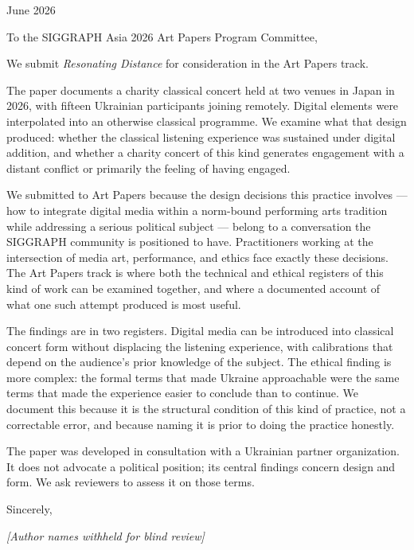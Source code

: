 \documentclass[12pt]{article}
\begin{document}
\begin{flushright}
June 2026
\end{flushright}

\bigskip\noindent
To the SIGGRAPH Asia 2026 Art Papers Program Committee,

\bigskip

We submit \textit{Resonating Distance} for consideration in the Art Papers track.

The paper documents a charity classical concert held at two venues in Japan in 2026, with
fifteen Ukrainian participants joining remotely. Digital elements were interpolated into an
otherwise classical programme. We examine what that design produced: whether the classical
listening experience was sustained under digital addition, and whether a charity concert of
this kind generates engagement with a distant conflict or primarily the feeling of having
engaged.

We submitted to Art Papers because the design decisions this practice involves --- how to
integrate digital media within a norm-bound performing arts tradition while addressing a
serious political subject --- belong to a conversation the SIGGRAPH community is positioned
to have. Practitioners working at the intersection of media art, performance, and ethics
face exactly these decisions. The Art Papers track is where both the technical and ethical
registers of this kind of work can be examined together, and where a documented account of
what one such attempt produced is most useful.

The findings are in two registers. Digital media can be introduced into classical concert
form without displacing the listening experience, with calibrations that depend on the
audience's prior knowledge of the subject. The ethical finding is more complex: the formal
terms that made Ukraine approachable were the same terms that made the experience easier to
conclude than to continue. We document this because it is the structural condition of this
kind of practice, not a correctable error, and because naming it is prior to doing the
practice honestly.

The paper was developed in consultation with a Ukrainian partner organization. It does not
advocate a political position; its central findings concern design and form. We ask
reviewers to assess it on those terms.

\bigskip

Sincerely,

\bigskip\bigskip

\textit{[Author names withheld for blind review]}
\end{document}
